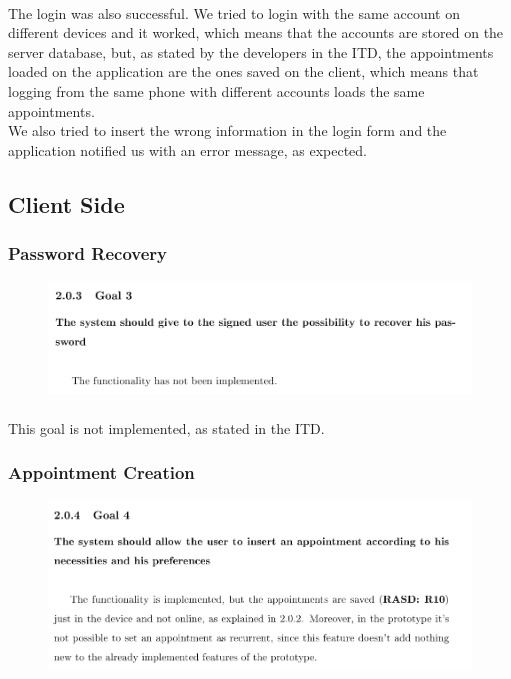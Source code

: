 \documentclass{article}
\begin{document}
			\paragraph{}The login was also successful. We tried to login with the same account on different devices and it worked, which means that the accounts are stored on the server database, but, as stated by the developers in the ITD, the appointments loaded on the application are the ones saved on the client, which means that logging from the same phone with different accounts loads the same appointments.\\ We also tried to insert the wrong information in the login form and the application notified us with an error message, as expected.
\newpage
		\subsection{Client Side}
			\subsubsection{Password Recovery}
			\begin{figure}[H]
			\includegraphics[width=\linewidth]{Images/Goals/Goal_3.png}
			\label{fig:G3}
			\end{figure}
			\paragraph{}This goal is not implemented, as stated in the ITD.
			\subsubsection{Appointment Creation}
			\begin{figure}[H]
			\includegraphics[width=\linewidth]{Images/Goals/Goal_4.png}
			\label{fig:G4}
			\end{figure}
\end{document}

